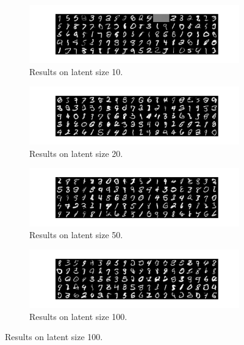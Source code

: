 \documentclass[12pt,letterpaper]{article}
\begin{document}
\begin{figure}[h]
    \begin{subfigure}{0.49\textwidth}
    \includegraphics[width=\linewidth]{VAE_MNIST_0_10_256.png}
    \caption{\small Results on latent size 10.} \label{fig:a}
    \end{subfigure}\hspace*{\fill}
    \begin{subfigure}{0.49\textwidth}
    \includegraphics[width=\linewidth]{VAE_MNIST_0_20_256.png}
    \caption{\small Results on latent size 20.} \label{fig:b}
    \end{subfigure}
    
    \medskip
    \begin{subfigure}{0.49\textwidth}
    \includegraphics[width=\linewidth]{VAE_MNIST_0_50_256.png}
    \caption{\small Results on latent size 50.} \label{fig:c}
    \end{subfigure}\hspace*{\fill}
    \begin{subfigure}{0.49\textwidth}
    \includegraphics[width=\linewidth]{VAE_MNIST_0_100_256.png}
    \caption{\small Results on latent size 100.} \label{fig:d}
    \end{subfigure}
    

\end{figure}
\end{document}
